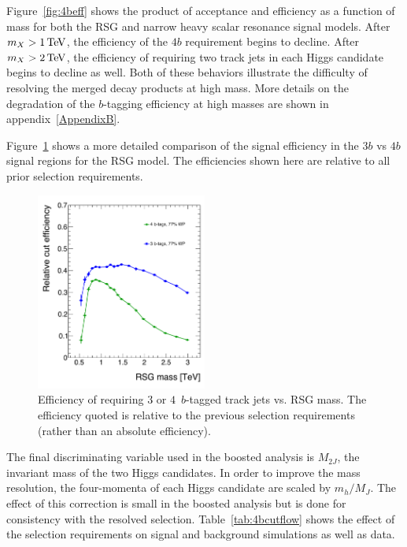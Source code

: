 Figure~\ref{fig:4beff} shows the product of acceptance and efficiency as a function of mass for both the RSG and narrow heavy scalar resonance signal models. After $m_{X} > 1 \TeV$, the efficiency of the $4b$ requirement begins to decline. After $m_{X} > 2 \TeV$, the efficiency of requiring two track jets in each Higgs candidate begins to decline as well. Both of these behaviors illustrate the difficulty of resolving the merged decay products at high mass. More details on the degradation of the $b$-tagging efficiency at high masses are shown in appendix~\ref{AppendixB}. 

Figure~\ref{fig:3bvs4b} shows a more detailed comparison of the signal efficiency in the $3b$ vs $4b$ signal regions for the RSG model. The efficiencies shown here are relative to all prior selection requirements. 

\begin{figure}[h!]
  \centering
  \captionsetup{justification=centering}

  \includegraphics[width=0.5\textwidth]{figures/3bvs4b_eff}
  \caption{Efficiency of requiring $3$ or $4\,$ $b$-tagged track jets vs. RSG mass. The efficiency quoted is relative to the previous selection requirements (rather than an absolute efficiency). }
  \label{fig:3bvs4b}
\end{figure}

The final discriminating variable used in the boosted analysis is $M_{2J}$, the invariant mass of the two Higgs candidates. In order to improve the mass resolution, the four-momenta of each Higgs candidate are scaled by $m_{h}/M_{J}$. The effect of this correction is small in the boosted analysis but is done for consistency with the resolved selection. Table~\ref{tab:4bcutflow} shows the effect of the selection requirements on signal and background simulations as well as data. 

